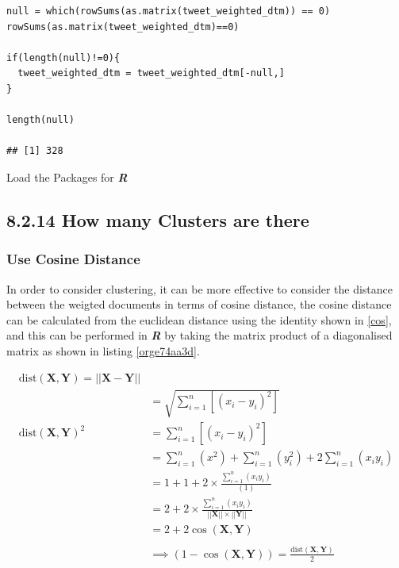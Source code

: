 \documentclass[11pt]{article}
\begin{document}
\begin{listing}[htbp]
\begin{verbatim}
null = which(rowSums(as.matrix(tweet_weighted_dtm)) == 0)
rowSums(as.matrix(tweet_weighted_dtm)==0)

if(length(null)!=0){
  tweet_weighted_dtm = tweet_weighted_dtm[-null,]
}

length(null)

## [1] 328
\end{verbatim}
\caption{\label{orgcc9d9f7}Load the Packages for \textbf{\textbf{\emph{R}}}}
\end{listing}
\subsection{8.2.14 How many Clusters are there}
\label{sec:org3c1e11d}
\subsubsection{Use Cosine Distance}
\label{sec:orge1f550b}
In order to consider clustering, it can be more effective to consider the distance between the weigted documents in terms of cosine distance, the cosine distance can be calculated from the euclidean distance using the identity shown in \eqref{cos}, and this can be performed in \textbf{\emph{R}} by taking the matrix product of a diagonalised matrix as shown in listing \ref{orge74aa3d}.

\begin{align}
\mathrm{dist}\left( \mathbf{X}, \mathbf{Y} \right)= \left| \left| \mathbf{X}-\mathbf{Y} \right| \right| \\
&= \sqrt{\sum^{n}_{i= 1}   \left[ \left( x_i-y_i \right)^2 \right] } \\
\mathrm{dist}\left( \mathbf{X}, \mathbf{Y} \right)^2&= \sum^{n}_{i= 1}  \left[ \left( x_i-y_i \right)^2 \right] \\
&= \sum^{n}_{i= 1}   \left( x^2 \right)+  \sum^{n}_{i= 1}   \left( y_i^2 \right)+ 2 \sum^{n}_{i= 1}   \left( x_iy_i \right) \\
&= 1+ 1 +  2 \times  \frac{\sum^{n}_{i= 1}   \left( x_iy_i \right)}{\left( 1 \right) }\\
&= 2+ 2\times \frac{\sum^{n}_{i= 1}   \left( x_iy_i \right)}{\left| \left| \mathbf{X} \right| \right|\times \left| \left| \mathbf{Y} \right| \right|}\\
&= 2+ 2 \cos\left( \mathbf{X}, \mathbf{Y} \right)\\
\ \\
& \implies  \left( 1- \cos\left( \mathbf{X}, \mathbf{Y} \right) \right) = \frac{\mathrm{dist}\left( \mathbf{X}, \mathbf{Y} \right)}{2} \label{cos}
\end{align}
\end{document}
